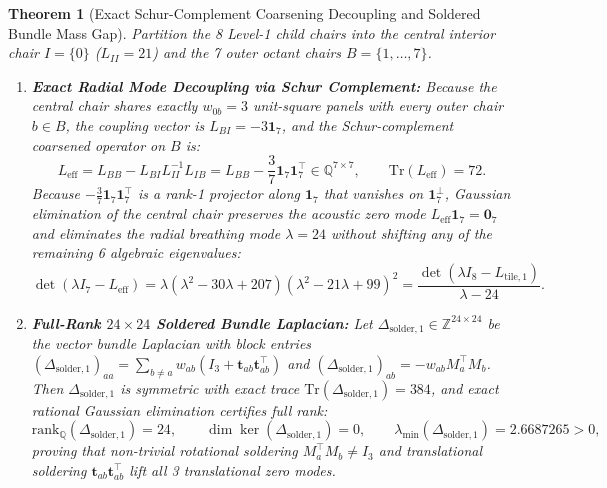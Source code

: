 \documentclass[11pt,a4paper]{article}
\newtheorem{theorem}{Theorem}[section]
\theoremstyle{definition}
\begin{document}
\begin{theorem}[Exact Schur-Complement Coarsening Decoupling and Soldered Bundle Mass Gap]
\label{thm:schur_soldered}
Partition the 8 Level-1 child chairs into the central interior chair $I = \{0\}$ ($L_{II} = 21$) and the 7 outer octant chairs $B = \{1,\dots,7\}$.
\begin{enumerate}
    \item \textbf{Exact Radial Mode Decoupling via Schur Complement:} Because the central chair shares exactly $w_{0b} = 3$ unit-square panels with every outer chair $b \in B$, the coupling vector is $L_{BI} = -3\mathbf{1}_7$, and the Schur-complement coarsened operator on $B$ is:
    \begin{equation}
    L_{\mathrm{eff}} = L_{BB} - L_{BI} L_{II}^{-1} L_{IB} = L_{BB} - \frac{3}{7}\mathbf{1}_7 \mathbf{1}_7^\top \in \mathbb{Q}^{7\times 7}, \qquad \mathrm{Tr}(L_{\mathrm{eff}}) = 72.
    \end{equation}
    Because $-\frac{3}{7}\mathbf{1}_7\mathbf{1}_7^\top$ is a rank-1 projector along $\mathbf{1}_7$ that vanishes on $\mathbf{1}_7^\perp$, Gaussian elimination of the central chair preserves the acoustic zero mode $L_{\mathrm{eff}}\mathbf{1}_7 = \mathbf{0}_7$ and eliminates the radial breathing mode $\lambda = 24$ without shifting any of the remaining 6 algebraic eigenvalues:
    \begin{equation}
    \det(\lambda I_7 - L_{\mathrm{eff}}) = \lambda(\lambda^2 - 30\lambda + 207)(\lambda^2 - 21\lambda + 99)^2 = \frac{\det(\lambda I_8 - L_{\mathrm{tile},1})}{\lambda - 24}.
    \end{equation}
    \item \textbf{Full-Rank $24\times 24$ Soldered Bundle Laplacian:} Let $\Delta_{\mathrm{solder},1} \in \mathbb{Z}^{24\times 24}$ be the vector bundle Laplacian with block entries $(\Delta_{\mathrm{solder},1})_{aa} = \sum_{b\neq a} w_{ab}(I_3 + \mathbf{t}_{ab}\mathbf{t}_{ab}^\top)$ and $(\Delta_{\mathrm{solder},1})_{ab} = -w_{ab} M_a^\top M_b$. Then $\Delta_{\mathrm{solder},1}$ is symmetric with exact trace $\mathrm{Tr}(\Delta_{\mathrm{solder},1}) = 384$, and exact rational Gaussian elimination certifies full rank:
    \begin{equation}
    \mathrm{rank}_{\mathbb{Q}}(\Delta_{\mathrm{solder},1}) = 24, \qquad \dim\ker(\Delta_{\mathrm{solder},1}) = 0, \qquad \lambda_{\min}(\Delta_{\mathrm{solder},1}) = 2.6687265 > 0,
    \end{equation}
    proving that non-trivial rotational soldering $M_a^\top M_b \neq I_3$ and translational soldering $\mathbf{t}_{ab}\mathbf{t}_{ab}^\top$ lift all 3 translational zero modes.
\end{enumerate}
\end{theorem}
\end{document}
